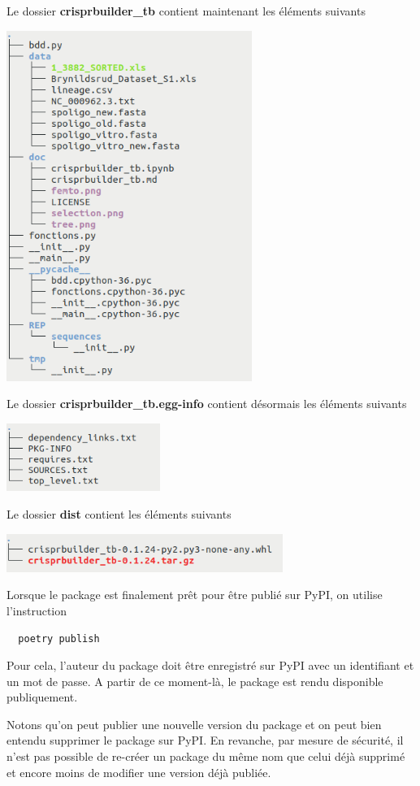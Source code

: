 \documentclass[twoside,a4paper,11pt,frenchb,openany]{report}
\begin{document}
Le dossier \textbf{crisprbuilder\_tb} contient maintenant les éléments suivants

\includegraphics[width=8cm]{rep_crispr.png}

Le dossier \textbf{crisprbuilder\_tb.egg-info} contient désormais les éléments suivants

\includegraphics[width=5cm]{rep_crispr_egg.png}

Le dossier \textbf{dist} contient les éléments suivants

\includegraphics[width=9cm]{rep_dist.png}

Lorsque le package est finalement prêt pour être publié sur PyPI, on utilise l’instruction
\begin{verbatim}  poetry publish\end{verbatim}
Pour cela, l'auteur du package doit être enregistré sur PyPI avec un identifiant et un mot de passe. A partir de ce moment-là, le package est rendu disponible publiquement.

Notons qu'on peut publier une nouvelle version du package et on peut bien entendu supprimer le package sur PyPI. En revanche, par mesure de sécurité, il n'est pas possible de re-créer un package du même nom que celui déjà supprimé et encore moins de modifier une version déjà publiée. 
\end{document}
